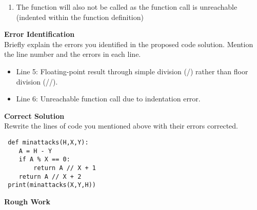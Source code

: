 \documentclass[a4paper]{exam}
\newcommand\heading[1]{\textbf{#1}}
\begin{document}
\begin{questions}
\begin{enumerate}
\item The function will also not be called as the function call is unreachable (indented within the function definition)
\end{enumerate}

    
\heading{Error Identification}\\
    Briefly explain the errors you identified in the proposed code solution. Mention the line number and the errors in each line.

\begin{itemize}
    \item Line 5: Floating-point result through simple division (/) rather than floor division (//).
    \item Line 6: Unreachable function call due to indentation error.
\end{itemize}

  \heading{Correct Solution}\\
  Rewrite the lines of code you mentioned above with their errors corrected.
  \begin{verbatim}
 def minattacks(H,X,Y):
    A = H - Y
    if A % X == 0:
        return A // X + 1 
    return A // X + 2
 print(minattacks(X,Y,H))
  \end{verbatim}
  \newpage
  \centerline{\heading{Rough Work}}

\end{questions}
\end{document}
